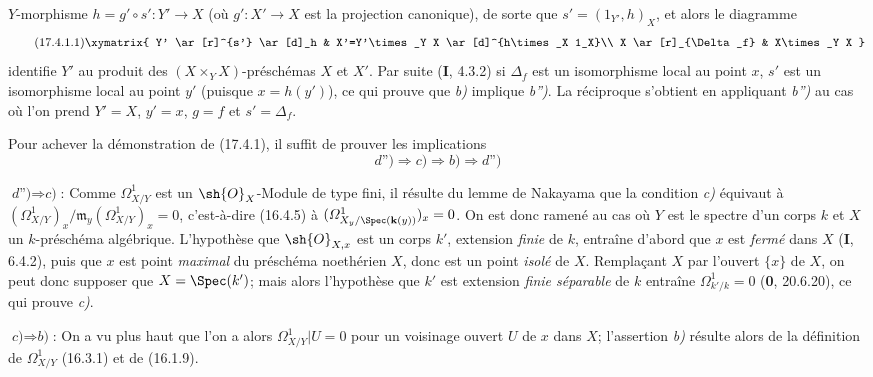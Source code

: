 $Y$-morphisme $h=g'\circ s':Y'\to X$ (où $g':X'\to X$ est la projection canonique), de sorte que $s'=(1_{Y'},h)_X$, et alors le diagramme
\[
\tag{17.4.1.1}
\label{IV.17.4.1.1}
\xymatrix{
Y' \ar[r]^{s'} \ar[d]_h & X'=Y'\times_Y X \ar[d]^{h\times_X 1_X}\\
X \ar[r]_{\Delta_f} & X\times_Y X
}
\]
identifie $Y'$ au produit des $(X\times_Y X)$-préschémas $X$ et $X'$. Par suite (\textbf{I}, 4.3.2) si $\Delta_f$ est un isomorphisme local au point $x$, $s'$ est un isomorphisme local au point $y'$ (puisque $x=h(y')$), ce qui prouve que \emph{b)} implique \emph{b'')}. La réciproque s'obtient en appliquant \emph{b'')} au cas où l'on prend $Y'=X$, $y'=x$, $g=f$ et $s'=\Delta_f$.

Pour achever la démonstration de (17.4.1), il suffit de prouver les implications
\[
\textit{d'')}\Rightarrow\textit{c)}\Rightarrow\textit{b)}\Rightarrow\textit{d'')}
\]

$\textit{d'')}\Rightarrow\textit{c)}$: Comme $\varOmega^1_{X/Y}$ est un $\sh{O}_X$-Module de type fini, il résulte du lemme de Nakayama que la condition \emph{c)} équivaut à $(\varOmega^1_{X/Y})_x/\mathfrak{m}_y(\varOmega^1_{X/Y})_x=0$, c'est-à-dire (16.4.5) à $(\varOmega^1_{X_y/\Spec(\mathbf{k}(y))})_x=0$. On est donc ramené au cas où $Y$ est le spectre d'un corps $k$ et $X$ un $k$-préschéma algébrique. L'hypothèse que $\sh{O}_{X,x}$ est un corps $k'$, extension \emph{finie} de $k$, entraîne d'abord que $x$ est \emph{fermé} dans $X$ (\textbf{I}, 6.4.2), puis que $x$ est point \emph{maximal} du préschéma noethérien $X$, donc est un point \emph{isolé} de $X$. Remplaçant $X$ par l'ouvert $\{x\}$ de $X$, on peut donc supposer que $X=\Spec(k')$; mais alors l'hypothèse que $k'$ est extension \emph{finie séparable} de $k$ entraîne $\Omega^1_{k'/k}=0$ (\textbf{0}, 20.6.20), ce qui prouve \emph{c)}.

$\textit{c)}\Rightarrow\textit{b)}$: On a vu plus haut que l'on a alors $\varOmega^1_{X/Y}|U=0$ pour un voisinage ouvert $U$ de $x$ dans $X$; l'assertion \emph{b)} résulte alors de la définition de $\varOmega^1_{X/Y}$ (16.3.1) et de (16.1.9).

